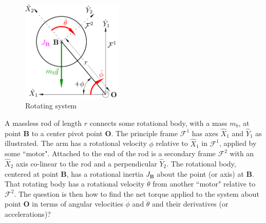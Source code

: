 \begin{figure}[htbp]
\centering
\includegraphics[width=0.43\textwidth]{figs/lemma-1}
\vspace{-6pt}
\caption{Rotating system}
\label{fig:lemma-1}
\vspace{-18pt}
\end{figure} 
\par
A massless rod of length $r$ connects some rotational body, with a mass $m_b$, at point $\mathbf{B}$ to a center pivot point $\mathbf{O}$. The principle frame $\mathcal{F}^{1}$ has axes $\hat{X}_1$ and $\hat{Y}_1$ as illustrated. The arm has a rotational velocity $\dot{\phi}$ relative to $\hat{X}_1$ in $\mathcal{F}^{1}$, applied by some ``motor". Attached to the end of the rod is a secondary frame $\mathcal{F}^2$ with an $\hat{X}_2$ axis co-linear to the rod and a perpendicular $\hat{Y}_2$. The rotational body, centered at point $\mathbf{B}$, has a rotational inertia $J_\mathbf{B}$ about the point (or axis) at $\mathbf{B}$. That rotating body has a rotational velocity $\dot{\theta}$ from another ``motor" relative to $\mathcal{F}^2$. The question is then how to find the net torque applied to the system about point $\mathbf{O}$ in terms of angular velocities $\dot{\phi}$ and $\dot{\theta}$ and their derivatives (or accelerations)?
